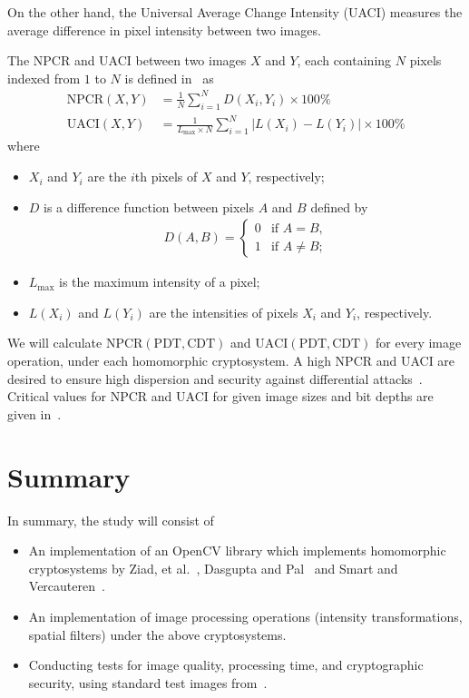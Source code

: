 \begin{description}
		On the other hand, the Universal Average Change Intensity (UACI) measures the average difference in pixel intensity between two images.

		The NPCR and UACI between two images $X$ and $Y$, each containing $N$ pixels indexed from $1$ to $N$ is defined in~\cite{wu_npcr_2011} as
		\begin{align}
            \mathrm{NPCR}(X,Y) &= \frac{1}{N}\sum_{i = 1}^{N}{D(X_i,Y_i)} \times 100\%\\
            \mathrm{UACI}(X,Y) &= \frac{1}{L_{\max} \times N} \sum_{i = 1}^{N}{ |L(X_i) - L(Y_i)| } \times 100\%
		\end{align}
		where
		\begin{itemize}
			\item $X_i$ and $Y_i$ are the $i$th pixels of $X$ and $Y$, respectively;
			\item $D$ is a difference function between pixels $A$ and $B$ defined by
			\begin{align}
				D(A,B) =
				\begin{cases}
					0 &  \text{if $A = B$},\\
					1 &  \text{if $A \neq B$};
				\end{cases}
			\end{align}
		\item $L_{\max}$ is the maximum intensity of a pixel;
		\item $L(X_i)$ and $L(Y_i)$ are the intensities of pixels $X_i$ and $Y_i$, respectively.
		\end{itemize}
        We will calculate $\mathrm{NPCR}(\mathrm{PDT},\mathrm{CDT})$ and $\mathrm{UACI}(\mathrm{PDT},\mathrm{CDT})$  for every image operation, under each homomorphic cryptosystem. A high NPCR and UACI are desired to ensure high dispersion and security against differential attacks~\cite{ahmed_benchmark_2016}. Critical values for NPCR and UACI for given image sizes and bit depths are given in~\cite{wu_npcr_2011}.
\end{description}

\section{Summary}

In summary, the study will consist of
\begin{itemize}
	\item An implementation of an OpenCV library which implements homomorphic cryptosystems by Ziad, et al.~\cite{ziad_cryptoimg:_2016}, Dasgupta and Pal~\cite{dasgupta_design_2016} and Smart and Vercauteren~\cite{hutchison_fully_2010}.
	\item An implementation of image processing operations (intensity transformations, spatial filters) under the above cryptosystems.
	\item Conducting tests for image quality, processing time, and cryptographic security, using standard test images from~\cite{gonzalez_image_nodate}.
\end{itemize}

